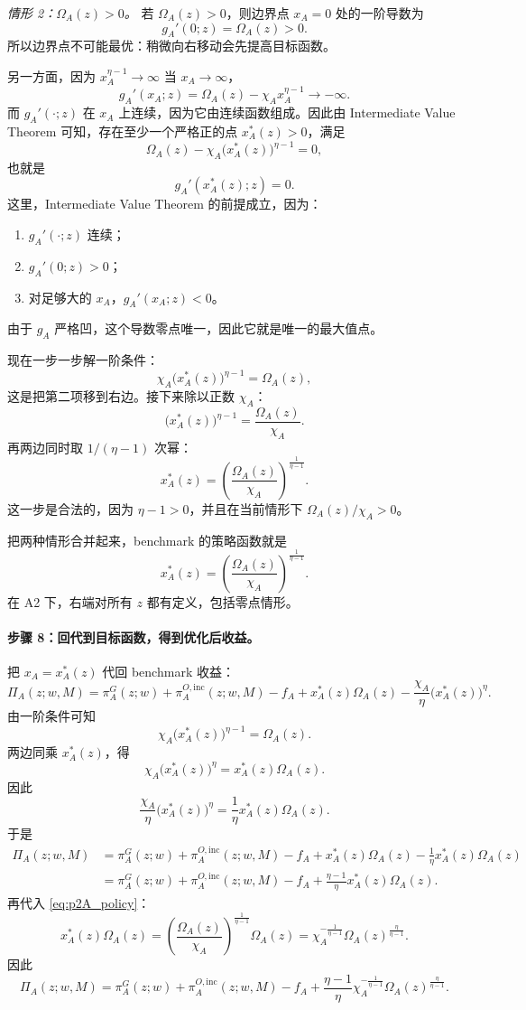 \textit{情形 2：$\Omega_A(z)>0$。}
若 $\Omega_A(z)>0$，则边界点 $x_A=0$ 处的一阶导数为
\[
g_A'(0;z)=\Omega_A(z)>0.
\]
所以边界点不可能最优：稍微向右移动会先提高目标函数。

另一方面，因为 $x_A^{\eta-1}\to\infty$ 当 $x_A\to\infty$，
\[
g_A'(x_A;z)=\Omega_A(z)-\chi_Ax_A^{\eta-1}\to -\infty.
\]
而 $g_A'(\cdot;z)$ 在 $x_A$ 上连续，因为它由连续函数组成。因此由 Intermediate Value Theorem 可知，存在至少一个严格正的点 $x_A^*(z)>0$，满足
\[
\Omega_A(z)-\chi_A\bigl(x_A^*(z)\bigr)^{\eta-1}=0,
\]
也就是
\[
g_A'(x_A^*(z);z)=0.
\]
这里，Intermediate Value Theorem 的前提成立，因为：
\begin{enumerate}
    \item $g_A'(\cdot;z)$ 连续；
    \item $g_A'(0;z)>0$；
    \item 对足够大的 $x_A$，$g_A'(x_A;z)<0$。
\end{enumerate}
由于 $g_A$ 严格凹，这个导数零点唯一，因此它就是唯一的最大值点。

现在一步一步解一阶条件：
\[
\chi_A\bigl(x_A^*(z)\bigr)^{\eta-1}=\Omega_A(z),
\]
这是把第二项移到右边。接下来除以正数 $\chi_A$：
\[
\bigl(x_A^*(z)\bigr)^{\eta-1}=\frac{\Omega_A(z)}{\chi_A}.
\]
再两边同时取 $1/(\eta-1)$ 次幂：
\[
x_A^*(z)=\left(\frac{\Omega_A(z)}{\chi_A}\right)^{\frac{1}{\eta-1}}.
\]
这一步是合法的，因为 $\eta-1>0$，并且在当前情形下 $\Omega_A(z)/\chi_A>0$。

把两种情形合并起来，benchmark 的策略函数就是
\begin{equation}
x_A^*(z)=\left(\frac{\Omega_A(z)}{\chi_A}\right)^{\frac{1}{\eta-1}}.
\label{eq:p2A_policy}
\end{equation}
在 A2 下，右端对所有 $z$ 都有定义，包括零点情形。

\paragraph{步骤 8：回代到目标函数，得到优化后收益。}
把 $x_A=x_A^*(z)$ 代回 benchmark 收益：
\[
\Pi_A(z;w,M)
=
\pi_A^G(z;w)+\pi_A^{O,\mathrm{inc}}(z;w,M)-f_A
+x_A^*(z)\Omega_A(z)-\frac{\chi_A}{\eta}\bigl(x_A^*(z)\bigr)^\eta.
\]
由一阶条件可知
\[
\chi_A\bigl(x_A^*(z)\bigr)^{\eta-1}=\Omega_A(z).
\]
两边同乘 $x_A^*(z)$，得
\[
\chi_A\bigl(x_A^*(z)\bigr)^\eta=x_A^*(z)\Omega_A(z).
\]
因此
\[
\frac{\chi_A}{\eta}\bigl(x_A^*(z)\bigr)^\eta
=
\frac{1}{\eta}x_A^*(z)\Omega_A(z).
\]
于是
\begin{align*}
\Pi_A(z;w,M)
&=
\pi_A^G(z;w)+\pi_A^{O,\mathrm{inc}}(z;w,M)-f_A
+x_A^*(z)\Omega_A(z)-\frac{1}{\eta}x_A^*(z)\Omega_A(z)\\
&=
\pi_A^G(z;w)+\pi_A^{O,\mathrm{inc}}(z;w,M)-f_A
+\frac{\eta-1}{\eta}x_A^*(z)\Omega_A(z).
\end{align*}
再代入 \eqref{eq:p2A_policy}：
\[
x_A^*(z)\Omega_A(z)
=
\left(\frac{\Omega_A(z)}{\chi_A}\right)^{\frac{1}{\eta-1}}\Omega_A(z)
=
\chi_A^{-\frac{1}{\eta-1}}\Omega_A(z)^{\frac{\eta}{\eta-1}}.
\]
因此
\begin{equation}
\Pi_A(z;w,M)
=
\pi_A^G(z;w)+\pi_A^{O,\mathrm{inc}}(z;w,M)-f_A
+\frac{\eta-1}{\eta}\chi_A^{-\frac{1}{\eta-1}}\Omega_A(z)^{\frac{\eta}{\eta-1}}.
\label{eq:p2A_payoff}
\end{equation}

